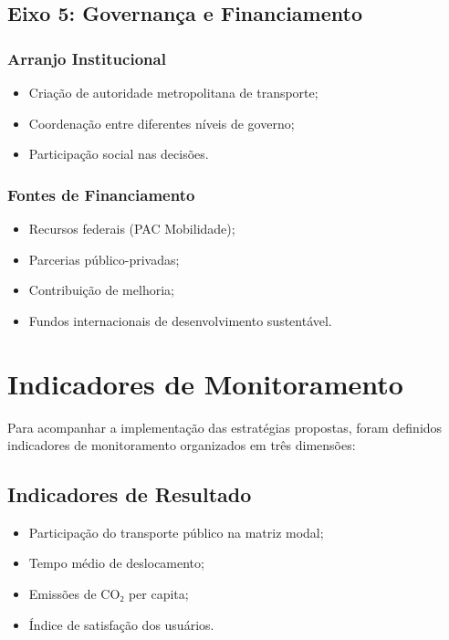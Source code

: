 \subsection{Eixo 5: Governança e Financiamento}

\subsubsection{Arranjo Institucional}
\begin{itemize}
    \item Criação de autoridade metropolitana de transporte;
    \item Coordenação entre diferentes níveis de governo;
    \item Participação social nas decisões.
\end{itemize}

\subsubsection{Fontes de Financiamento}
\begin{itemize}
    \item Recursos federais (PAC Mobilidade);
    \item Parcerias público-privadas;
    \item Contribuição de melhoria;
    \item Fundos internacionais de desenvolvimento sustentável.
\end{itemize}

\section{Indicadores de Monitoramento}

Para acompanhar a implementação das estratégias propostas, foram definidos indicadores de monitoramento organizados em três dimensões:

\subsection{Indicadores de Resultado}
\begin{itemize}
    \item Participação do transporte público na matriz modal;
    \item Tempo médio de deslocamento;
    \item Emissões de CO₂ per capita;
    \item Índice de satisfação dos usuários.
\end{itemize}


